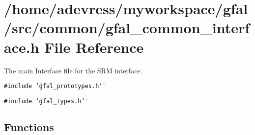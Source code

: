 \section{/home/adevress/myworkspace/gfal/src/common/gfal\_\-common\_\-interface.h File Reference}
\label{gfal__common__interface_8h}
The main Interface file for the SRM interface. 

{\tt \#include \char`\"{}gfal\_\-prototypes.h\char`\"{}}\par
{\tt \#include \char`\"{}gfal\_\-types.h\char`\"{}}\par
\subsection*{Functions}
